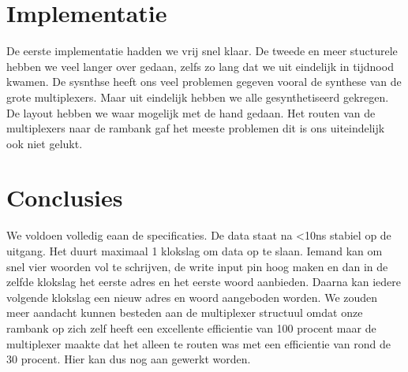 \documentclass{scrartcl}  %
\begin{document}

\section{Implementatie}
De eerste implementatie hadden we vrij snel klaar. De tweede en meer stucturele hebben we veel langer over gedaan, zelfs zo lang dat we uit eindelijk in tijdnood kwamen. De sysnthse heeft ons veel problemen gegeven vooral de synthese van de grote multiplexers. Maar uit eindelijk hebben we alle gesynthetiseerd gekregen. De layout hebben we waar mogelijk met de hand gedaan. Het routen van de multiplexers naar de rambank gaf het meeste problemen dit is ons uiteindelijk ook niet gelukt.

\section{Conclusies}
We voldoen volledig eaan de specificaties.
De data staat na <10ns stabiel op de uitgang.
Het duurt maximaal 1 klokslag om data op te slaan.
Iemand kan om snel vier woorden vol te schrijven, de write input pin hoog maken en dan in de zelfde klokslag het eerste adres en het eerste woord aanbieden.
Daarna kan iedere volgende klokslag een nieuw adres en woord aangeboden worden.
We zouden meer aandacht kunnen besteden aan de multiplexer structuul omdat onze rambank op zich zelf heeft een excellente efficientie van 100 procent maar de multiplexer maakte dat het alleen te routen was met een efficientie van rond de 30 procent.
Hier kan dus nog aan gewerkt worden.

\newpage
{}
\end{document}
